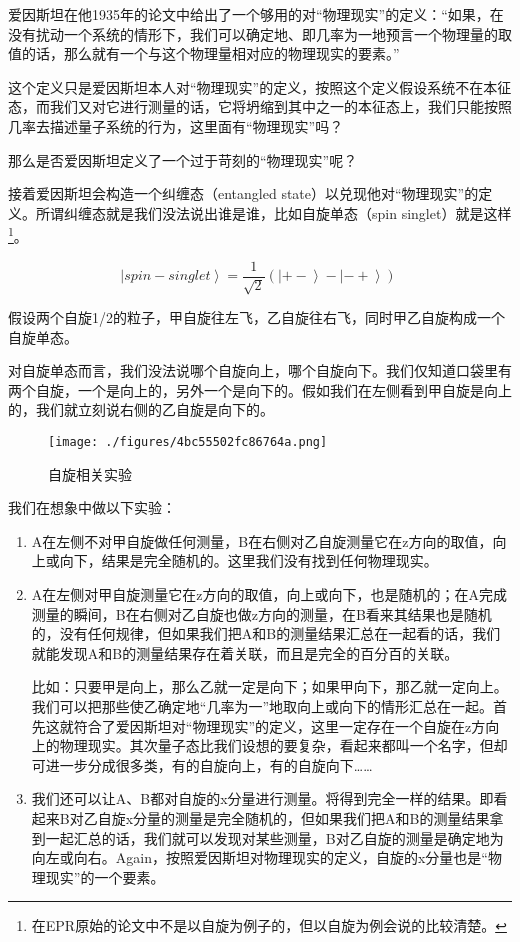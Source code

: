 爱因斯坦在他1935年的论文中给出了一个够用的对“物理现实”的定义：“如果，在没有扰动一个系统的情形下，我们可以确定地、即几率为一地预言一个物理量的取值的话，那么就有一个与这个物理量相对应的物理现实的要素。”

这个定义只是爱因斯坦本人对“物理现实”的定义，按照这个定义假设系统不在本征态，而我们又对它进行测量的话，它将坍缩到其中之一的本征态上，我们只能按照几率去描述量子系统的行为，这里面有“物理现实”吗？

那么是否爱因斯坦定义了一个过于苛刻的“物理现实”呢？

接着爱因斯坦会构造一个纠缠态（entangled state）以兑现他对“物理现实”的定义。所谓纠缠态就是我们没法说出谁是谁，比如自旋单态（spin singlet）就是这样\footnote{在EPR原始的论文中不是以自旋为例子的，但以自旋为例会说的比较清楚。}。

\begin{equation}
\left| spin-singlet \right\rangle = \frac{1}{\sqrt{2}} \left( \left|+- \right\rangle - \left| - + \right\rangle  \right)~
\end{equation}

假设两个自旋1/2的粒子，甲自旋往左飞，乙自旋往右飞，同时甲乙自旋构成一个自旋单态。

对自旋单态而言，我们没法说哪个自旋向上，哪个自旋向下。我们仅知道口袋里有两个自旋，一个是向上的，另外一个是向下的。假如我们在左侧看到甲自旋是向上的，我们就立刻说右侧的乙自旋是向下的。

\begin{figure}[ht]
\centering
\texttt{[image: ./figures/4bc55502fc86764a.png]}
\caption{自旋相关实验} \label{fig_QMPre3_9}
\end{figure}


我们在想象中做以下实验：

\begin{enumerate}
\item 

A在左侧不对甲自旋做任何测量，B在右侧对乙自旋测量它在z方向的取值，向上或向下，结果是完全随机的。这里我们没有找到任何物理现实。

\item

A在左侧对甲自旋测量它在z方向的取值，向上或向下，也是随机的；在A完成测量的瞬间，B在右侧对乙自旋也做z方向的测量，在B看来其结果也是随机的，没有任何规律，但如果我们把A和B的测量结果汇总在一起看的话，我们就能发现A和B的测量结果存在着关联，而且是完全的百分百的关联。

比如：只要甲是向上，那么乙就一定是向下；如果甲向下，那乙就一定向上。我们可以把那些使乙确定地“几率为一”地取向上或向下的情形汇总在一起。首先这就符合了爱因斯坦对“物理现实”的定义，这里一定存在一个自旋在z方向上的物理现实。其次量子态比我们设想的要复杂，看起来都叫一个名字，但却可进一步分成很多类，有的自旋向上，有的自旋向下……

\item

我们还可以让A、B都对自旋的x分量进行测量。将得到完全一样的结果。即看起来B对乙自旋x分量的测量是完全随机的，但如果我们把A和B的测量结果拿到一起汇总的话，我们就可以发现对某些测量，B对乙自旋的测量是确定地为向左或向右。Again，按照爱因斯坦对物理现实的定义，自旋的x分量也是“物理现实”的一个要素。

\end{enumerate}

